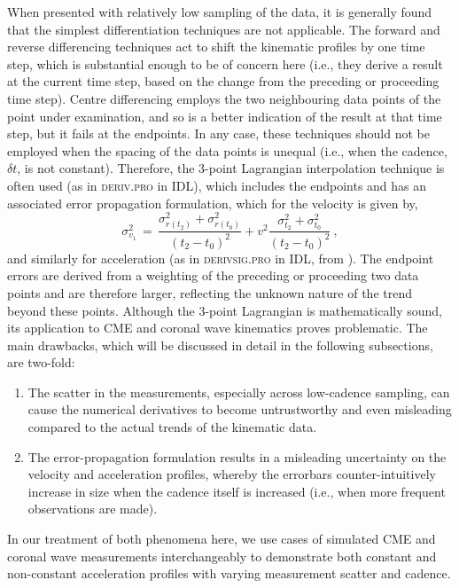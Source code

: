 \documentclass[structabstract]{aa}
\begin{document}
When presented with relatively low sampling of the data, it is generally found that the simplest differentiation techniques are not applicable. The forward and reverse differencing techniques act to shift the kinematic profiles by one time step, which is substantial enough to be of concern here (i.e., they derive a result at the current time step, based on the change from the preceding or proceeding time step). Centre differencing employs the two neighbouring data points of the point under examination, and so is a better indication of the result at that time step, but it fails at the endpoints. In any case, these techniques should not be employed when the spacing of the data points is unequal (i.e., when the cadence, $\delta t$, is not constant). Therefore, the 3-point Lagrangian interpolation technique is often used (as in \textsc{deriv.pro} in IDL), which includes the endpoints and has an associated error propagation formulation, which for the velocity is given by,
\begin{equation}
\sigma_{v_1}^2 \,=\, \frac{\sigma_{r(t_2)}^2+\sigma_{r(t_0)}^2}{(t_2-t_0)^2} + v^2 \frac{\sigma_{t_2}^2+\sigma_{t_0}^2}{(t_2-t_0)^2}\ ,
\label{vel_err}
\end{equation}
and similarly for acceleration (as in \textsc{derivsig.pro} in IDL, from \citealt{2003drea.book.....B}). The endpoint errors are derived from a weighting of the preceding or proceeding two data points and are therefore larger, reflecting the unknown nature of the trend beyond these points.
Although the 3-point Lagrangian is mathematically sound, its application to CME and coronal wave kinematics proves problematic. The main drawbacks, which will be discussed in detail in the following subsections, are two-fold:
\begin{enumerate}
\item The scatter in the measurements, especially across low-cadence sampling, can cause the numerical derivatives to become untrustworthy and even misleading compared to the actual trends of the kinematic data.
\item The error-propagation formulation results in a misleading uncertainty on the velocity and acceleration profiles, whereby the errorbars counter-intuitively increase in size when the cadence itself is increased (i.e., when more frequent observations are made).
\end{enumerate}
In our treatment of both phenomena here, we use cases of simulated CME and coronal wave measurements interchangeably to demonstrate both constant and non-constant acceleration profiles with varying measurement scatter and cadence.
\end{document}
